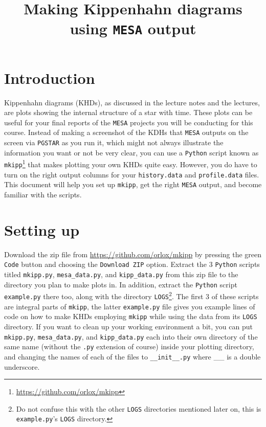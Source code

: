 \documentclass[11pt,a4paper]{article}
\begin{document}
\title{\textbf{Making Kippenhahn diagrams using \texttt{MESA} output}}
\author{}
\date{}
\maketitle

\noindent
\section{Introduction}
Kippenhahn diagrams (KHDs), as discussed in the lecture notes and the lectures, are plots showing the internal structure of a star with time. These plots can be useful for your final reports of the \texttt{MESA} projects you will be conducting for this course. Instead of making a screenshot of the KDHs that \texttt{MESA} outputs on the screen via \texttt{PGSTAR} as you run it, which might not always illustrate the information you want or not be very clear, you can use a \texttt{Python} script known as \texttt{mkipp}\footnote{\url{https://github.com/orlox/mkipp}} that makes plotting your own KHDs quite easy. However, you do have to turn on the right output columns for your \texttt{history.data} and \texttt{profile.data} files. This document will help you set up \texttt{mkipp}, get the right \texttt{MESA} output, and become familiar with the scripts.

\section{Setting up}
Download the zip file from \url{https://github.com/orlox/mkipp} by pressing the green \texttt{Code} button and choosing the \texttt{Download ZIP} option. Extract the 3 \texttt{Python} scripts titled \texttt{mkipp.py}, \texttt{mesa\_data.py}, and \texttt{kipp\_data.py} from this zip file to the directory you plan to make plots in. In addition, extract the \texttt{Python} script \texttt{example.py} there too, along with the directory \texttt{LOGS}\footnote{Do not confuse this with the other \texttt{LOGS} directories mentioned later on, this is \texttt{example.py}'s \texttt{LOGS} directory.}. The first 3 of these scripts are integral parts of \texttt{mkipp}, the latter \texttt{example.py} file gives you example lines of code on how to make KHDs employing \texttt{mkipp} while using the data from its \texttt{LOGS} directory. If you want to clean up your working environment a bit, you can put \texttt{mkipp.py}, \texttt{mesa\_data.py}, and \texttt{kipp\_data.py} each into their own directory of the same name (without the \texttt{.py} extension of course) inside your plotting directory, and changing the names of each of the files to \texttt{\_\_init\_\_.py} where \_\_ is a double underscore. 
\end{document}
